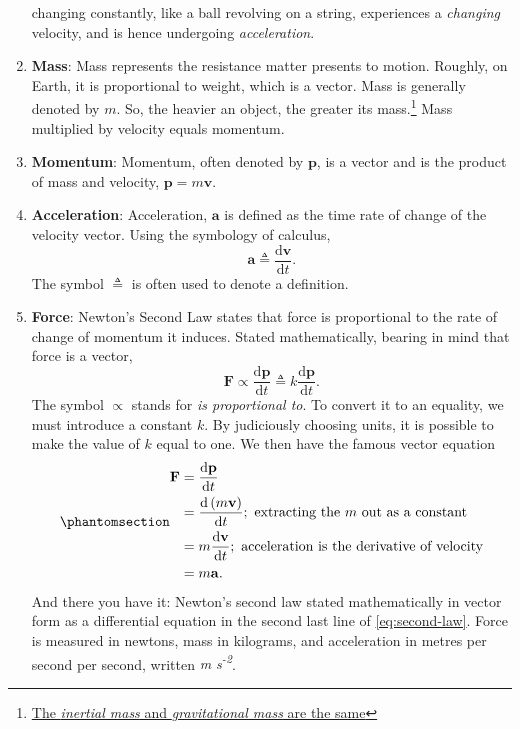 \documentclass[
  a4paper,
]{article}
\begin{document}
\begin{enumerate}
  changing constantly, like a ball revolving on a string, experiences a
  \emph{changing} velocity, and is hence undergoing \emph{acceleration}.
\item
  \textbf{Mass}: Mass represents the resistance matter presents to
  motion. Roughly, on Earth, it is proportional to weight, which is a
  vector. Mass is generally denoted by \(m\). So, the heavier an object,
  the greater its mass.\footnote{\href{https://en.wikipedia.org/wiki/Equivalence_principle.}{The
    \emph{inertial mass} and \emph{gravitational mass} are the same}}
  Mass multiplied by velocity equals momentum.
\item
  \textbf{Momentum}: Momentum, often denoted by \(\mathbf{p}\), is a
  vector and is the product of mass and velocity,
  \(\mathbf{p} = m\mathbf{v}\).
\item
  \textbf{Acceleration}: Acceleration, \(\mathbf{a}\) is defined as the
  time rate of change of the velocity vector. Using the symbology of
  calculus, \[
  \mathbf{a} \triangleq \frac{\mathrm{d}\mathbf{v}}{\mathrm{d}t}.
  \] The symbol \(\triangleq\) is often used to denote a definition.
\item
  \textbf{Force}: Newton's Second Law states that force is proportional
  to the rate of change of momentum it induces. Stated mathematically,
  bearing in mind that force is a vector, \[
  \mathbf{F} \propto \frac{\mathrm{d}\mathbf{p}}{\mathrm{d}t} \triangleq k\frac{\mathrm{d}\mathbf{p}}{\mathrm{d}t}.
  \] The symbol \(\propto\) stands for \emph{is proportional to}. To
  convert it to an equality, we must introduce a constant \(k\). By
  judiciously choosing units, it is possible to make the value of \(k\)
  equal to one. We then have the famous vector equation
  \begin{equation}\phantomsection\label{eq:second-law}{
  \begin{aligned}
  \mathbf{F} &= \frac{\mathrm{d}\mathbf{p}}{\mathrm{d}t}\\
  &= \frac{\mathrm{d}\left(m\mathbf{v}\right)}{\mathrm{d}t}; \text{ extracting the $m$ out as a constant}\\
  &= m\frac{\mathrm{d}\mathbf{v}}{\mathrm{d}t}; \text{ acceleration is the derivative of velocity}\\
  &= m\mathbf{a}.
  \end{aligned}
  }\end{equation} And there you have it: Newton's second law stated
  mathematically in vector form as a differential equation in the second
  last line of \cref{eq:second-law}. Force is measured in newtons, mass
  in kilograms, and acceleration in metres per second per second,
  written \emph{m s\textsuperscript{-2}}.
\end{enumerate}
\end{document}
